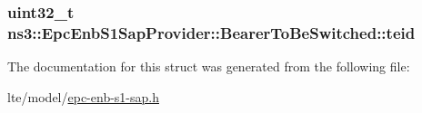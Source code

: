 \subsubsection[{\texorpdfstring{teid}{teid}}]{\setlength{\rightskip}{0pt plus 5cm}uint32\+\_\+t ns3\+::\+Epc\+Enb\+S1\+Sap\+Provider\+::\+Bearer\+To\+Be\+Switched\+::teid}\hypertarget{structns3_1_1EpcEnbS1SapProvider_1_1BearerToBeSwitched_a12705e29d058ee33a767acf3088212a3}{}\label{structns3_1_1EpcEnbS1SapProvider_1_1BearerToBeSwitched_a12705e29d058ee33a767acf3088212a3}


The documentation for this struct was generated from the following file\+:\begin{DoxyCompactItemize}
\item 
lte/model/\hyperlink{epc-enb-s1-sap_8h}{epc-\/enb-\/s1-\/sap.\+h}\end{DoxyCompactItemize}

